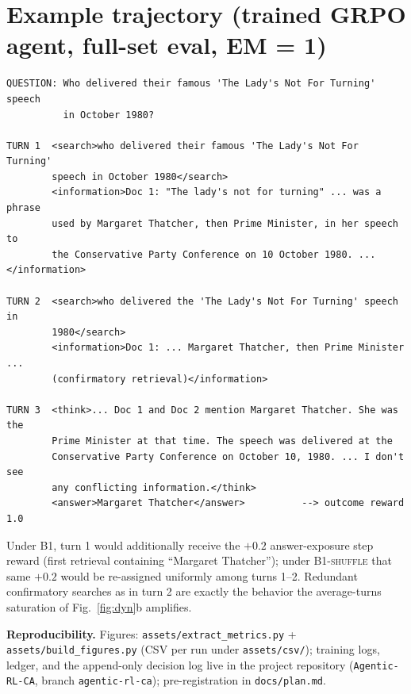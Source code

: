 \documentclass[11pt,a4paper]{article}
\newcommand{\arm}[1]{\textsc{#1}}
\begin{document}
\appendix
\section{Example trajectory (trained GRPO agent, full-set eval, EM = 1)}

\begin{Verbatim}[fontsize=\footnotesize,frame=single]
QUESTION: Who delivered their famous 'The Lady's Not For Turning' speech
          in October 1980?

TURN 1  <search>who delivered their famous 'The Lady's Not For Turning'
        speech in October 1980</search>
        <information>Doc 1: "The lady's not for turning" ... was a phrase
        used by Margaret Thatcher, then Prime Minister, in her speech to
        the Conservative Party Conference on 10 October 1980. ...</information>

TURN 2  <search>who delivered the 'The Lady's Not For Turning' speech in
        1980</search>
        <information>Doc 1: ... Margaret Thatcher, then Prime Minister ...
        (confirmatory retrieval)</information>

TURN 3  <think>... Doc 1 and Doc 2 mention Margaret Thatcher. She was the
        Prime Minister at that time. The speech was delivered at the
        Conservative Party Conference on October 10, 1980. ... I don't see
        any conflicting information.</think>
        <answer>Margaret Thatcher</answer>          --> outcome reward 1.0
\end{Verbatim}

\noindent Under \arm{B1}, turn 1 would additionally receive the $+0.2$ answer-exposure step
reward (first retrieval containing ``Margaret Thatcher''); under \arm{B1-shuffle} that same
$+0.2$ would be re-assigned uniformly among turns 1--2. Redundant confirmatory searches as in
turn 2 are exactly the behavior the average-turns saturation of Fig.~\ref{fig:dyn}b amplifies.

\vspace{0.5em}
\noindent\textbf{Reproducibility.} Figures: \texttt{assets/extract\_metrics.py} +
\texttt{assets/build\_figures.py} (CSV per run under \texttt{assets/csv/}); training logs,
ledger, and the append-only decision log live in the project repository
(\texttt{Agentic-RL-CA}, branch \texttt{agentic-rl-ca}); pre-registration in
\texttt{docs/plan.md}.
\end{document}
